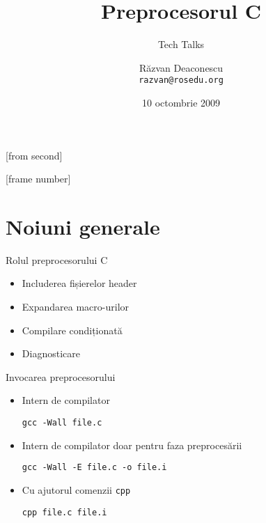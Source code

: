 \documentclass{beamer}
\title[Preprocesorul C]{Preprocesorul C}
\subtitle{Tech Talks}
\institute{ROSEdu}
\author[Răzvan]{Răzvan Deaconescu \\ \texttt{razvan@rosedu.org}}
\date{10 octombrie 2009}
\begin{document}
[from second]

[frame number]

\frame{\titlepage}

\frame{\tableofcontents}

\section{Noiuni generale}

\frame{\tableofcontents[currentsection]}

\begin{frame}{Rolul preprocesorului C}
	\begin{itemize}		%
		\item Includerea fișierelor header
		\item Expandarea macro-urilor
		\item Compilare condiționată
		\item Diagnosticare
	\end{itemize}
\end{frame}

\begin{frame}{Invocarea preprocesorului}
	\begin{itemize}
		\item Intern de compilator
			\begin{beamerboxesrounded}[lower=block body,shadow=true]{}
				\large{\texttt{gcc -Wall file.c}}
			\end{beamerboxesrounded}
		\item Intern de compilator doar pentru faza preprocesării
			\begin{beamerboxesrounded}[lower=block body,shadow=true]{}
				\large{\texttt{gcc -Wall -E file.c -o file.i}}
			\end{beamerboxesrounded}
		\item Cu ajutorul comenzii \texttt{cpp}
			\begin{beamerboxesrounded}[lower=block body,shadow=true]{}
				\large{\texttt{cpp file.c file.i}}
			\end{beamerboxesrounded}
	\end{itemize}
\end{frame}
\end{document}
